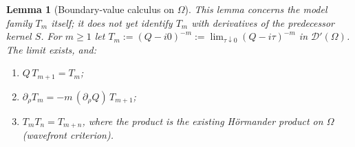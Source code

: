 \documentclass{article}
\newtheorem{lemma}[proposition]{Lemma}
\theoremstyle{remark}
\begin{document}
\begin{lemma}[Boundary-value calculus on $\Omega$]
\label{lem:bv}
This lemma concerns the model family $T_m$ itself; it does not yet identify $T_m$ with derivatives of the predecessor kernel $S$.
For $m\ge1$ let $T_m:=(Q-i0)^{-m}:=\lim_{\tau\downarrow0}(Q-i\tau)^{-m}$ in $\mathcal D'(\Omega)$.
The limit exists, and:
\begin{enumerate}
\item[(a)] $Q\,T_{m+1}=T_m$;
\item[(b)] $\partial_\rho T_m=-m\,(\partial_\rho Q)\,T_{m+1}$;
\item[(c)] $T_mT_n=T_{m+n}$, where the product is the existing H\"ormander product on $\Omega$ (wavefront criterion).
\end{enumerate}
\end{lemma}
\end{document}
